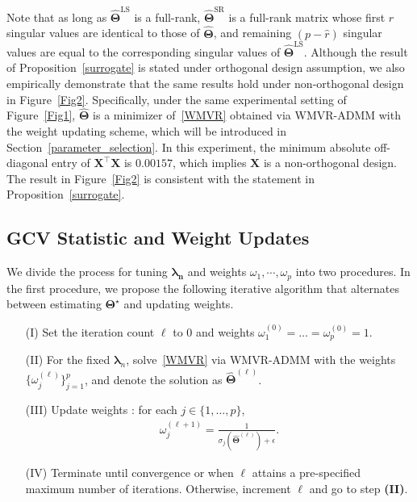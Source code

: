 \documentclass[alpha-refs]{wiley-article}
\begin{document}
Note that as long as $\widehat{\boldsymbol{\Theta}}^{\text{LS}}$ is a full-rank, $\widehat{\boldsymbol{\Theta}}^{\text{SR}}$ is a full-rank matrix whose first $\widehat{r}$ singular values are identical to those of $\widehat{\boldsymbol{\Theta}}$, and remaining $(p-\widehat{r})$ singular values are equal to the  corresponding singular values of $\widehat{\boldsymbol{\Theta}}^{\text{LS}}$.
Although the result of Proposition~\ref{surrogate} is stated under orthogonal design assumption, we also empirically demonstrate that the same results hold under non-orthogonal design in Figure~\ref{Fig2}.
Specifically, under the same experimental setting of Figure~\ref{Fig1}, $\widehat{\boldsymbol{\Theta}}$ is a minimizer of~\eqref{WMVR} obtained via WMVR-ADMM with the weight updating scheme, which will be introduced in Section~\ref{parameter_selection}.
In this experiment, the minimum absolute off-diagonal entry of $\boldsymbol{X}^{\top}\boldsymbol{X}$ is $0.00157$, which implies $\boldsymbol{X}$ is a non-orthogonal design.
The result in Figure~\ref{Fig2} is consistent with the statement in Proposition~\ref{surrogate}.

\subsection{GCV Statistic and Weight Updates}
We divide the process for tuning $\boldsymbol{\lambda_{n}}$ and weights $\omega_{1}, \cdots, \omega_{p}$ into two procedures.
In the first procedure, we propose the following iterative algorithm that alternates between estimating $\boldsymbol{\Theta}^{\star}$ and updating weights.
\begin{enumerate}
    \item[(I)] Set the iteration count $\ell$ to $0$ and weights $\omega_{1}^{(0)}=\dots=\omega_{p}^{(0)}=1$.
    \item[(II)] For the fixed $\boldsymbol{\lambda}_{n}$, solve~\eqref{WMVR} via WMVR-ADMM with the weights $\{\omega_{j}^{(\ell)}\}_{j=1}^{p}$, and denote the solution as  $\widehat{\boldsymbol{\Theta}}^{(\ell)}$.
    \item[(III)] Update weights : for each $j\in\{1,\dots,p\}$,
    \begin{align} \label{weight}
        \omega_{j}^{(\ell+1)}=\frac{1}{\sigma_{j}(\widehat{\boldsymbol{\Theta}}^{(\ell)})+\epsilon}.
    \end{align}
    \item[(IV)] Terminate until convergence or when $\ell$ attains a pre-specified maximum number of iterations.
    Otherwise, increment $\ell$ and go to step {\bf(II)}.
\end{enumerate}
\end{document}
